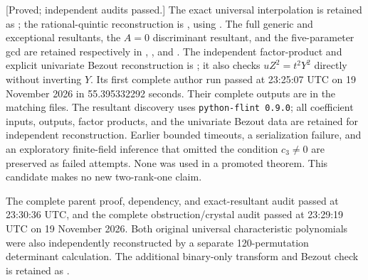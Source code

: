 \begin{remark}
\label{rem:uniform-eleven-verification-scope-candidate}
\textup{[Proved; independent audits passed.]}
The exact universal interpolation is retained as
;
the rational-quintic reconstruction is
, using
.
The full generic and exceptional resultants, the $A=0$ discriminant
resultant, and the five-parameter gcd are retained respectively in
,
, and
.
The independent factor-product and explicit univariate Bezout reconstruction
is ;
it also checks $uZ^2=t^2Y^2$ directly without inverting $Y$.
Its first complete author run passed at 23:25:07 UTC on 19 November 2026
in 55.395332292 seconds.
Their complete outputs are in the matching
 files. The resultant discovery uses
\texttt{python-flint 0.9.0}; all coefficient inputs, outputs, factor
products, and the univariate Bezout data are retained for independent
reconstruction. Earlier bounded timeouts, a serialization failure, and
an exploratory finite-field inference that omitted the condition
$c_3\ne0$ are preserved as failed attempts. None was used in a
promoted theorem. This candidate makes no new two-rank-one claim.

The complete parent proof, dependency, and exact-resultant audit passed at
23:30:36 UTC, and the complete obstruction/crystal audit
passed at 23:29:19 UTC on 19 November 2026.
Both original universal characteristic polynomials were also independently
reconstructed by a separate 120-permutation determinant calculation.
The additional binary-only transform and Bezout check is retained as
.
\end{remark}
